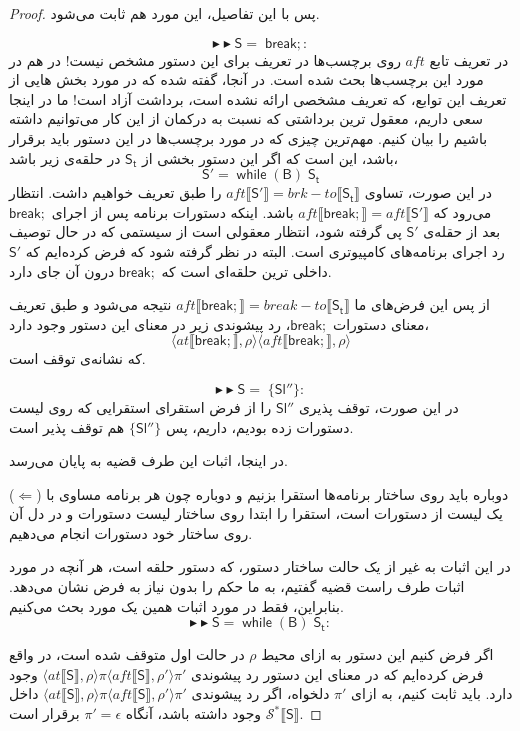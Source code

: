 \begin{proof}
پس با این تفاصیل، این مورد هم ثابت می‌شود.

$$\blacktriangleright\blacktriangleright \mathsf{S=\; break;}:$$
در تعریف تابع $aft$ روی برچسب‌ها در \cite{calcul} تعریف برای این دستور مشخص نیست! در \cite{cousotbook} هم در مورد این برچسب‌ها بحث شده است. در آنجا، گفته شده که در مورد بخش هایی از تعریف این توابع، که تعریف مشخصی ارائه نشده است، برداشت آزاد است! ما در اینجا سعی داریم، معقول ترین برداشتی که نسبت به درکمان از این کار می‌توانیم داشته باشیم را بیان کنیم. مهم‌ترین چیزی که در مورد برچسب‌ها در این دستور باید برقرار باشد، این است که اگر این دستور بخشی از $\mathsf{S_t}$ در حلقه‌ی زیر باشد،
$$\mathsf{S'=\; while\; (B)\; S_t}$$
در این صورت، تساوی 
$aft \llbracket \mathsf{S'} \rrbracket = brk-to \llbracket \mathsf{S_t} \rrbracket $
را طبق تعریف خواهیم داشت. انتظار می‌رود که\break 
$aft \llbracket \mathsf{break;} \rrbracket = aft \llbracket \mathsf{S'} \rrbracket$ 
باشد. اینکه دستورات برنامه پس از اجرای $\mathsf{break;}$ بعد از حقله‌ی $\mathsf{S'}$ پی گرفته شود، انتظار معقولی است از سیستمی که در حال توصیف رد اجرای برنامه‌های کامپیوتری است. البته در نظر گرفته شود که فرض کرده‌ایم که $\mathsf{S'}$ داخلی ترین حلقه‌ای است که $\mathsf{break;}$ درون آن جای دارد.

 از پس این فرض‌های ما 
$aft \llbracket \mathsf{break;} \rrbracket = break-to \llbracket \mathsf{S_t} \rrbracket$ 
نتیجه می‌شود و طبق تعریف معنای دستورات 
$\mathsf{break;}$،
رد پیشوندی زیر در معنای این دستور وجود دارد،
$$\langle at \llbracket \mathsf{break;} \rrbracket , \rho \rangle
\langle aft \llbracket \mathsf{break;} \rrbracket , \rho \rangle$$
 که نشانه‌ی توقف است.
 

$$\blacktriangleright\blacktriangleright \mathsf{S=\; \{ Sl'' \}}:$$
	در این صورت، توقف پذیری $\mathsf{Sl''}$ را از فرض استقرای استقرایی که روی لیست دستورات زده بودیم، داریم، پس $\mathsf{\{Sl''\}}$ هم توقف پذیر است.
	
	
در اینجا، اثبات این طرف قضیه به پایان می‌رسد.

($\Leftarrow$)
دوباره باید روی ساختار برنامه‌ها استقرا بزنیم و دوباره چون هر برنامه مساوی با یک لیست از دستورات است، استقرا را ابتدا روی ساختار لیست دستورات و در دل آن روی ساختار خود دستورات انجام می‌دهیم.

در این اثبات به غیر از یک حالت ساختار دستور، که دستور حلقه است، هر آنچه در مورد اثبات طرف راست قضیه گفتیم، به ما حکم را بدون نیاز به فرض نشان می‌دهد. بنابراین، فقط در مورد اثبات همین یک مورد بحث می‌کنیم. 
$$\blacktriangleright\blacktriangleright \mathsf{S=\; while\; (B)\; S_t}:$$

اگر فرض کنیم این دستور به ازای محیط $\rho$ در حالت اول متوقف شده است، در واقع فرض کرده‌ایم که در معنای این دستور رد پیشوندی 
$\langle at \llbracket \mathsf{S} \rrbracket , \rho \rangle \pi \langle aft \llbracket \mathsf{S} \rrbracket , \rho' \rangle \pi'$ 
وجود دارد.
باید ثابت کنیم، به ازای $\pi'$ دلخواه، اگر رد پیشوندی
$\langle at \llbracket \mathsf{S} \rrbracket , \rho \rangle \pi \langle aft \llbracket \mathsf{S} \rrbracket , \rho' \rangle \pi'$ 
داخل 
$\mathcal{S^*}\llbracket \mathsf{S} \rrbracket$
وجود داشته باشد، آنگاه
$\pi'=\epsilon$
برقرار است.


\end{proof}
